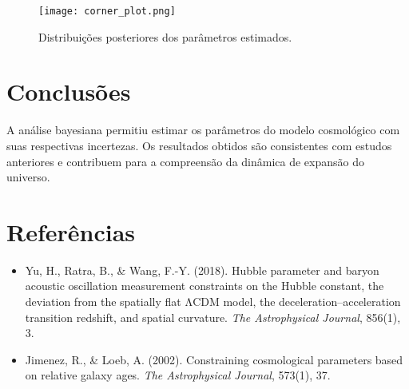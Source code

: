 \documentclass[12pt]{article}
\begin{document}
\begin{figure}[h!]
\centering
\texttt{[image: corner\_plot.png]}
\caption{Distribuições posteriores dos parâmetros estimados.}
\label{fig:corner}
\end{figure}

\section{Conclusões}

A análise bayesiana permitiu estimar os parâmetros do modelo cosmológico com suas respectivas incertezas. Os resultados obtidos são consistentes com estudos anteriores e contribuem para a compreensão da dinâmica de expansão do universo.

\section*{Referências}

\begin{itemize}
    \item Yu, H., Ratra, B., \& Wang, F.-Y. (2018). Hubble parameter and baryon acoustic oscillation measurement constraints on the Hubble constant, the deviation from the spatially flat ΛCDM model, the deceleration–acceleration transition redshift, and spatial curvature. \textit{The Astrophysical Journal}, 856(1), 3.
    \item Jimenez, R., \& Loeb, A. (2002). Constraining cosmological parameters based on relative galaxy ages. \textit{The Astrophysical Journal}, 573(1), 37.
\end{itemize}
\end{document}
